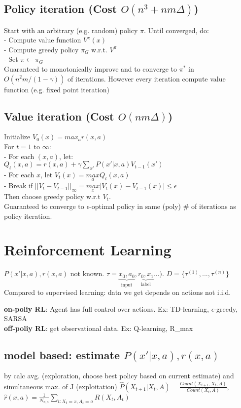 \subsection{Policy iteration (Cost $O(n^3+nm\Delta)$)}
Start with an arbitrary (e.g. random) policy $\pi$.
Until converged, do:\\
- Compute value function $V^\pi (x)$\\
- Compute greedy policy $\pi_G$ w.r.t. $V^\pi$\\
- Set $\pi \leftarrow \pi_G$\\
Guaranteed to monotonically improve and to converge to $\pi^*$ in $O(n^2m/(1-\gamma))$ of iterations.
However every iteration compute value function (e.g. fixed point iteration)

\subsection{Value iteration (Cost $O(nm\Delta)$)}
Initialize $V_0(x)=max_a r(x,a)$\\
For $t=1$ to $\infty$:\\
- For each $(x,a)$, let: \\
$Q_t(x,a)=r(x,a)+\gamma\sum_{x'}P(x'|x,a)V_{t-1}(x')$\\
- For each $x$, let $V_t(x)=\underset{a}{max}Q_t(x,a)$\\
- Break if $||V_t-V_{t-1}||_{\infty}=\underset{x}{max}|V_t(x)-V_{t-1}(x)|\leq\epsilon$\\
Then choose greedy policy w.r.t $V_t$.\\
Guaranteed to converge to $\epsilon$-optimal policy in same (poly) \# of iterations as policy iteration.

\section{Reinforcement Learning}
$P(x'|x,a), r(x,a)$ not known. $\tau = \underbrace{x_{0}, a_{0}}_{\text{input}},
\underbrace{r_{0}, x_{1}}_{\text{label}}...)$. $D=\{\tau^{(1)}, ..., \tau^{(n )}\}$
Compared to supervised learning: data we get depends on actions \textrightarrow not i.i.d.

\textbf{on-poliy RL}: Agent has full control over actions.
Ex: TD-learning, $\epsilon$-greedy, SARSA\\
\textbf{off-poliy RL}: get observational data. Ex: Q-learning, R_max

\subsection{model based: estimate $P(x'|x,a), r(x,a)$}
 by calc avg. (exploration, choose best policy based on current estimate)
and simultaneous max. of J (exploitation)
$\hat{P}(X_{t+1}|X_{t},A) = \frac{Count(X_{t+1}, X_{t}, A)}{Count(X_t, A)}$,
$\hat{r}(x,a) = \frac{1}{N_{x,a}} \sum_{t:X_{t}=x, A_t=a} R(X_t, A_t)$\\

